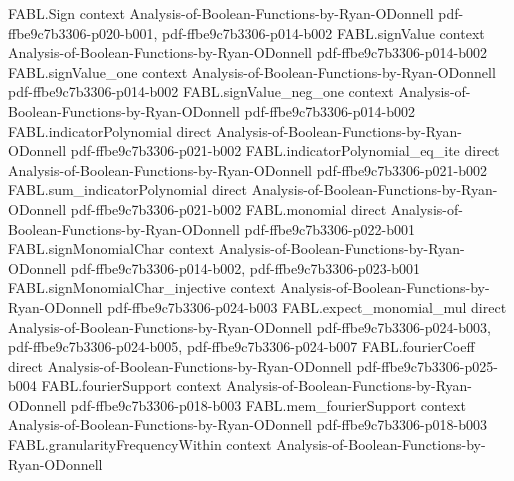 \begin{theorem}
\label{FABL.variance_eq_totalInfluence_iff_lowDegreeWeight_eq_secondMoment}
\leanok
{}
\proofstep
  {FABL.Sign}
  {context}
  {Analysis-of-Boolean-Functions-by-Ryan-ODonnell}
  {pdf-ffbe9c7b3306-p020-b001,
    pdf-ffbe9c7b3306-p014-b002}
\proofstep
  {FABL.signValue}
  {context}
  {Analysis-of-Boolean-Functions-by-Ryan-ODonnell}
  {pdf-ffbe9c7b3306-p014-b002}
\proofstep
  {FABL.signValue_one}
  {context}
  {Analysis-of-Boolean-Functions-by-Ryan-ODonnell}
  {pdf-ffbe9c7b3306-p014-b002}
\proofstep
  {FABL.signValue_neg_one}
  {context}
  {Analysis-of-Boolean-Functions-by-Ryan-ODonnell}
  {pdf-ffbe9c7b3306-p014-b002}
\proofstep
  {FABL.indicatorPolynomial}
  {direct}
  {Analysis-of-Boolean-Functions-by-Ryan-ODonnell}
  {pdf-ffbe9c7b3306-p021-b002}
\proofstep
  {FABL.indicatorPolynomial_eq_ite}
  {direct}
  {Analysis-of-Boolean-Functions-by-Ryan-ODonnell}
  {pdf-ffbe9c7b3306-p021-b002}
\proofstep
  {FABL.sum_indicatorPolynomial}
  {direct}
  {Analysis-of-Boolean-Functions-by-Ryan-ODonnell}
  {pdf-ffbe9c7b3306-p021-b002}
\proofstep
  {FABL.monomial}
  {direct}
  {Analysis-of-Boolean-Functions-by-Ryan-ODonnell}
  {pdf-ffbe9c7b3306-p022-b001}
\proofstep
  {FABL.signMonomialChar}
  {context}
  {Analysis-of-Boolean-Functions-by-Ryan-ODonnell}
  {pdf-ffbe9c7b3306-p014-b002,
    pdf-ffbe9c7b3306-p023-b001}
\proofstep
  {FABL.signMonomialChar_injective}
  {context}
  {Analysis-of-Boolean-Functions-by-Ryan-ODonnell}
  {pdf-ffbe9c7b3306-p024-b003}
\proofstep
  {FABL.expect_monomial_mul}
  {direct}
  {Analysis-of-Boolean-Functions-by-Ryan-ODonnell}
  {pdf-ffbe9c7b3306-p024-b003,
    pdf-ffbe9c7b3306-p024-b005,
    pdf-ffbe9c7b3306-p024-b007}
\proofstep
  {FABL.fourierCoeff}
  {direct}
  {Analysis-of-Boolean-Functions-by-Ryan-ODonnell}
  {pdf-ffbe9c7b3306-p025-b004}
\proofstep
  {FABL.fourierSupport}
  {context}
  {Analysis-of-Boolean-Functions-by-Ryan-ODonnell}
  {pdf-ffbe9c7b3306-p018-b003}
\proofstep
  {FABL.mem_fourierSupport}
  {context}
  {Analysis-of-Boolean-Functions-by-Ryan-ODonnell}
  {pdf-ffbe9c7b3306-p018-b003}
\proofstep
  {FABL.granularityFrequencyWithin}
  {context}
  {Analysis-of-Boolean-Functions-by-Ryan-ODonnell}

\end{theorem}
